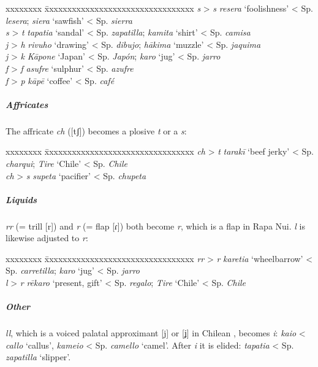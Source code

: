 \ea
\begin{tabbing}
 xxxxxxxx \= xxxxxxxxxxxxxxxxxxxxxxxxxxxxxxxxx\kill
 \textit{s} > \textit{s} \> \textit{resera} ‘foolishness’ {\textless} Sp. \textit{lesera}; \textit{siera} ‘sawfish’ {\textless} Sp. \textit{sierra} \\
\textit{s} > \textit{t} \>  \textit{tapatia} ‘sandal’ {\textless} Sp. \textit{zapatilla}; \textit{kamita} ‘shirt’ {\textless} Sp. \textit{camisa} \\
 \textit{j} > \textit{h} \>  \textit{rivuho} ‘drawing’ {\textless} Sp. \textit{dibujo}; \textit{hākima} ‘muzzle’ {\textless} Sp. \textit{jaquima} \\
\textit{j} > \textit{k} \>  \textit{Kāpone} ‘Japan’ {\textless} Sp. \textit{Japón}; \textit{karo} ‘jug’ {\textless} Sp. \textit{jarro} \\
 \textit{f} > \textit{f} \> \textit{asufre} ‘sulphur’ {\textless} Sp. \textit{azufre} \\
 \textit{f} > \textit{p} \>  \textit{kāpē} ‘coffee’ {\textless} Sp. \textit{café} 
\end{tabbing}
\z 
\subparagraph{Affricates} The affricate \textit{ch} ([tʃ]) becomes a plosive \textit{t} or a  \textit{s}:

\ea
\begin{tabbing}
 xxxxxxxx \= xxxxxxxxxxxxxxxxxxxxxxxxxxxxxxxxx\kill
 \textit{ch} > \textit{t} \> \textit{tarakī} ‘beef jerky’ {\textless} Sp. \textit{charqui}; \textit{Tire} ‘Chile’ {\textless} Sp. \textit{Chile} \\
 \textit{ch} > \textit{s}  \> \textit{supeta} ‘pacifier’ {\textless} Sp. \textit{chupeta} 
\end{tabbing}
\z 
\subparagraph{Liquids}  \textit{rr} (= trill [r]) and \textit{r} (= flap [ɾ]) both become \textit{r}, which is a flap in Rapa Nui. \textit{l} is likewise adjusted to \textit{r}:

\ea
\begin{tabbing}
 xxxxxxxx \= xxxxxxxxxxxxxxxxxxxxxxxxxxxxxxxxx\kill
 \textit{rr} > \textit{r} \> \textit{karetia} ‘wheelbarrow’ {\textless} Sp. \textit{carretilla}; \textit{karo} ‘jug’ {\textless} Sp. \textit{jarro} \\
 \textit{l} > \textit{r} \>  \textit{rēkaro} ‘present, gift’ {\textless} Sp. \textit{regalo}; \textit{Tire} ‘Chile’ {\textless} Sp. \textit{Chile} 
\end{tabbing}
\z 
\subparagraph{Other}  \textit{ll}, which is a voiced palatal approximant [j] or  [ʝ] in Chilean , becomes \textit{i}: \textit{kaio} {\textless} \textit{callo} ‘callus’, \textit{kameio} {\textless} Sp. \textit{camello} ‘camel’. After \textit{i} it is elided: \textit{tapatia} {\textless} Sp. \textit{zapatilla} ‘slipper’.

